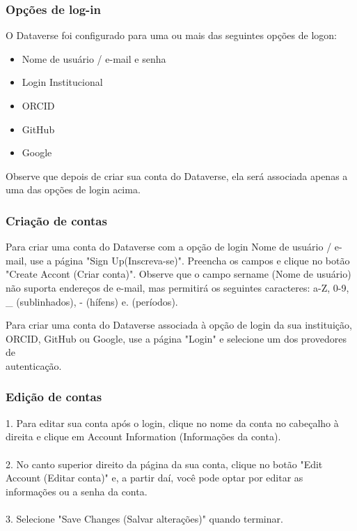 \documentclass[12pt,hidelinks]{article}
\begin{document}
        \subsubsection{Opções de log-in}
        
\qquad O Dataverse foi configurado para uma ou mais das seguintes opções de logon:
        
\begin{itemize}
\item Nome de usuário / e-mail e senha
\item Login Institucional
\item ORCID
\item GitHub
\item Google
\end{itemize}

Observe que depois de criar sua conta do Dataverse, ela será associada apenas a uma das opções de login acima.

        \subsubsection{Criação de contas}
        
\qquad Para criar uma conta do Dataverse com a opção de login Nome de usuário / e-mail, use a página "Sign Up(Inscreva-se)". Preencha os campos e clique no botão "Create Accont (Criar conta)". Observe que o campo sername (Nome de usuário) não suporta endereços de e-mail, mas permitirá os seguintes caracteres: a-Z, 0-9, \_ (sublinhados), - (hífens) e. (períodos).

Para criar uma conta do Dataverse associada à opção de login da sua instituição, ORCID, GitHub ou Google, use a página "Login" e selecione um dos provedores de \\autenticação.

        \subsubsection{Edição de contas}
        
1. Para editar sua conta após o login, clique no nome da conta no cabeçalho à direita e clique em Account Information (Informações da conta).\\\\
2. No canto superior direito da página da sua conta, clique no botão "Edit Account (Editar conta)" e, a partir daí, você pode optar por editar as informações ou a senha da conta.\\\\
3. Selecione "Save Changes (Salvar alterações)" quando terminar.\\
\end{document}
